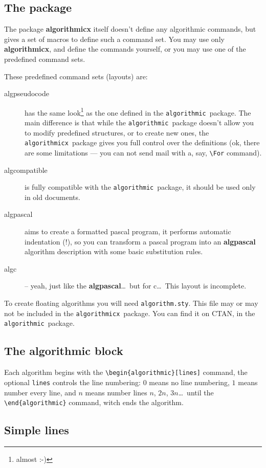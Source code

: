 \documentclass{article}
\newcommand{\alg}{\texttt{algorithmicx}}
\newcommand{\old}{\texttt{algorithmic}}
\begin{document}
\subsection{The package}
The package \textbf{algorithmicx} itself doesn't define any algorithmic commands, but gives 
a set of macros to define such a command set. You may use only \textbf{algorithmicx}, and define 
the commands yourself, or you may use one of the predefined command sets.

These predefined command sets (layouts) are:
\begin{description}
\item[algpseudocode] has the same look\footnote{almost :-)} as the one defined in the
\old\ package. The main difference is that while the \old\ package doesn't 
allow you to modify predefined structures, or to create new ones, the \alg\ 
package gives you full control over the definitions (ok, there are some 
limitations --- you can not send mail with a, say, \verb:\For: command).
\item[algcompatible] is fully compatible with the \old\ package, it should be
used only in old documents.
\item[algpascal] aims to create a formatted pascal program, it performs 
automatic indentation (!), so you can transform a pascal program into an 
\textbf{algpascal} algorithm description with some basic substitution rules.
\item[algc] -- yeah, just like the \textbf{algpascal}\dots\ but for c\dots\ 
This layout is incomplete.
\end{description}

To create floating algorithms you will need \verb:algorithm.sty:. This file may or may not be
included in the \alg\ package. You can find it on CTAN, in the \old\ package.



\subsection{The algorithmic block}
Each algorithm begins with the \verb:\begin{algorithmic}[lines]: command, the 
optional \verb:lines: controls the line numbering: $0$ means no line numbering, 
$1$ means number every line, and $n$ means number lines $n$, $2n$, $3n$\dots\ until the
\verb:\end{algorithmic}: command, witch ends the algorithm.



\subsection{Simple lines}
\end{document}
